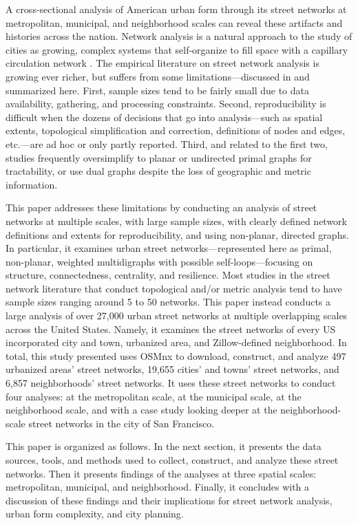 \documentclass{article}
\begin{document}
A cross-sectional analysis of American urban form through its street networks at metropolitan, municipal, and neighborhood scales can reveal these artifacts and histories across the nation. Network analysis is a natural approach to the study of cities as growing, complex systems that self-organize to fill space with a capillary circulation network \cite{masucci_random_2009}. The empirical literature on street network analysis is growing ever richer, but suffers from some limitations---discussed in \cite{boeing_osmnx:_2017} and summarized here. First, sample sizes tend to be fairly small due to data availability, gathering, and processing constraints. Second, reproducibility is difficult when the dozens of decisions that go into analysis---such as spatial extents, topological simplification and correction, definitions of nodes and edges, etc.---are ad hoc or only partly reported. Third, and related to the first two, studies frequently oversimplify to planar or undirected primal graphs for tractability, or use dual graphs despite the loss of geographic and metric information. 

This paper addresses these limitations by conducting an analysis of street networks at multiple scales, with large sample sizes, with clearly defined network definitions and extents for reproducibility, and using non-planar, directed graphs. In particular, it examines urban street networks---represented here as primal, non-planar, weighted multidigraphs with possible self-loops---focusing on structure, connectedness, centrality, and resilience. Most studies in the street network literature that conduct topological and/or metric analysis tend to have sample sizes ranging around 5 to 50 networks. This paper instead conducts a large analysis of over 27,000 urban street networks at multiple overlapping scales across the United States. Namely, it examines the street networks of every US incorporated city and town, urbanized area, and Zillow-defined neighborhood. In total, this study presented uses OSMnx \cite{boeing_osmnx:_2017} to download, construct, and analyze 497 urbanized areas' street networks, 19,655 cities' and towns' street networks, and 6,857 neighborhoods' street networks. It uses these street networks to conduct four analyses: at the metropolitan scale, at the municipal scale, at the neighborhood scale, and with a case study looking deeper at the neighborhood-scale street networks in the city of San Francisco.

This paper is organized as follows. In the next section, it presents the data sources, tools, and methods used to collect, construct, and analyze these street networks. Then it presents findings of the analyses at three spatial scales: metropolitan, municipal, and neighborhood. Finally, it concludes with a discussion of these findings and their implications for street network analysis, urban form complexity, and city planning.
\end{document}
